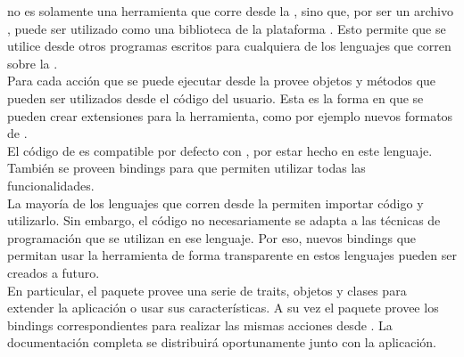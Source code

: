 \fronttier no es solamente una herramienta que corre desde la \cli, sino que, 
por ser un archivo \jar, puede ser utilizado como una biblioteca de la 
plataforma \java. Esto permite que se utilice desde otros programas escritos 
para cualquiera de los lenguajes que corren sobre la \jvm.\\
Para cada acción que se puede ejecutar desde la \cli \fronttier provee objetos 
y métodos que pueden ser utilizados desde el código del usuario. Esta es la 
forma en que se pueden crear extensiones para la herramienta, como por ejemplo 
nuevos formatos de \conffiles.\\
El código de \fronttier es compatible por defecto con \scala, por estar hecho 
en este lenguaje. También se proveen bindings para \java que permiten utilizar 
todas las funcionalidades.\\
La mayoría de los lenguajes que corren desde la \jvm permiten importar código 
\java y utilizarlo. Sin embargo, el código \java no necesariamente se adapta a 
las técnicas de programación que se utilizan en ese lenguaje. Por eso, nuevos 
bindings que permitan usar la herramienta de forma transparente en estos 
lenguajes pueden ser creados a futuro.\\
En particular, el paquete  provee una serie de 
traits, objetos y clases para extender la aplicación o usar sus 
características. A su vez el paquete  
provee los bindings correspondientes para realizar las mismas acciones desde 
\java. La documentación completa se distribuirá oportunamente junto con la 
aplicación.
